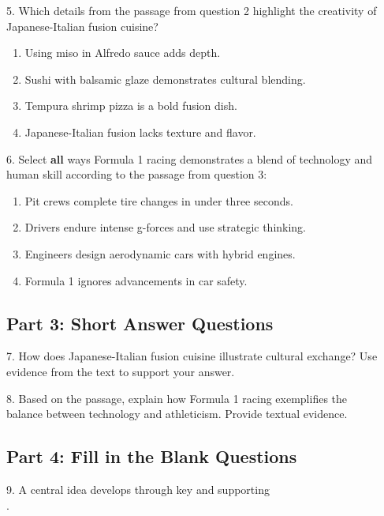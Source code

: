\documentclass[12pt]{article}
\begin{document}
\vspace{0.5cm}

5. Which details from the passage from question 2 highlight the creativity of 
\\Japanese-Italian fusion cuisine?  
\begin{enumerate}[label=\Alph*.]
    \item Using miso in Alfredo sauce adds depth.  
    \item Sushi with balsamic glaze demonstrates cultural blending.  
    \item Tempura shrimp pizza is a bold fusion dish.  
    \item Japanese-Italian fusion lacks texture and flavor.  
\end{enumerate}

\vspace{1cm}

6. Select \textbf{all} ways Formula 1 racing demonstrates a blend of technology and human skill according to the passage from question 3:  
\begin{enumerate}[label=\Alph*.]
    \item Pit crews complete tire changes in under three seconds.  
    \item Drivers endure intense g-forces and use strategic thinking.  
    \item Engineers design aerodynamic cars with hybrid engines.  
    \item Formula 1 ignores advancements in car safety.  
\end{enumerate}



\subsection*{Part 3: Short Answer Questions}

7. How does Japanese-Italian fusion cuisine illustrate cultural exchange? Use \\evidence from the text to support your answer.  
\vspace{4cm}

8. Based on the passage, explain how Formula 1 racing exemplifies the \\balance between technology and athleticism. Provide textual evidence.  
\vspace{4cm}

\subsection*{Part 4: Fill in the Blank Questions}
\vspace{1cm}
9. A central idea develops through key \underline{\hspace{4cm}} and supporting\\ \underline{\hspace{4cm}}.  
\vspace{1cm}
\end{document}
